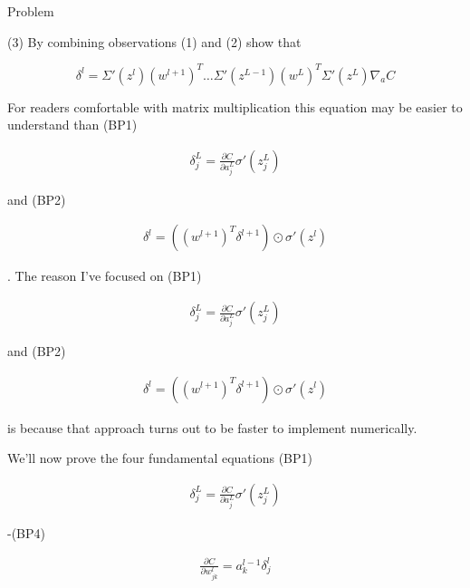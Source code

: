 \begin{exerciseBox}{Problem}
\begin{itemize}
(3) By combining observations (1) and (2) show that


\begin{equation}
\delta^l = \Sigma'(z^l) (w^{l+1})^T \ldots \Sigma'(z^{L-1}) (w^L)^T \Sigma'(z^L) \nabla_a C
\tag{35}
\end{equation}

For readers comfortable with matrix multiplication this equation may be easier to understand than (BP1)


\begin{align*}
\delta^L_j = \frac{\partial C}{\partial a^L_j} \sigma'(z^L_j) \nonumber
\end{align*}

and (BP2)


\begin{align*}
\delta^l = ((w^{l+1})^T \delta^{l+1}) \odot \sigma'(z^l) \nonumber
\end{align*}

. The reason I've focused on (BP1)


\begin{align*}
\delta^L_j = \frac{\partial C}{\partial a^L_j} \sigma'(z^L_j) \nonumber
\end{align*}

and (BP2)


\begin{align*}
\delta^l = ((w^{l+1})^T \delta^{l+1}) \odot \sigma'(z^l) \nonumber
\end{align*}

is because that approach turns out to be faster to implement numerically.

\end{itemize}

\end{exerciseBox}





We'll now prove the four fundamental equations (BP1)

\begin{align*}
\delta^L_j = \frac{\partial C}{\partial a^L_j} \sigma'(z^L_j) \nonumber
\end{align*}

\noindent -(BP4)

\begin{align*}
\frac{\partial C}{\partial w^l_{jk}} = a^{l-1}_k \delta^l_j \nonumber
\end{align*}


